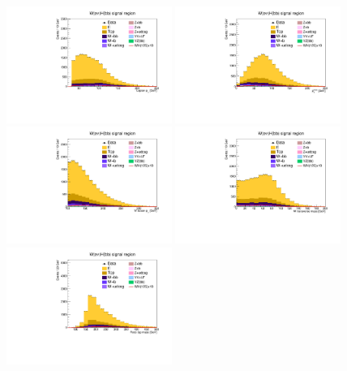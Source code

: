 \begin{figure}[tbp]
  \begin{center}
    \includegraphics[width=0.48\textwidth]{figures/wlnhbb2016/resolved/WenWHSR_lepton1Pt.pdf}
    \includegraphics[width=0.48\textwidth]{figures/wlnhbb2016/resolved/WenWHSR_pfmet.pdf}
    \includegraphics[width=0.48\textwidth]{figures/wlnhbb2016/resolved/WenWHSR_WpT.pdf}
    \includegraphics[width=0.48\textwidth]{figures/wlnhbb2016/resolved/WenWHSR_mTW.pdf}
    \includegraphics[width=0.48\textwidth]{figures/wlnhbb2016/resolved/WenWHSR_topMassLep1Met.pdf}

\end{center}
\end{figure}
